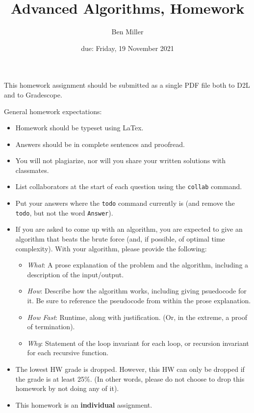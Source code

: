 \documentclass{article}
\title{Advanced Algorithms, Homework \hwnum}
\author{Ben Miller}
\date{due: Friday, 19 November 2021}
\begin{document}
\maketitle

This homework assignment should be
submitted as a single PDF file both to D2L and to Gradescope.

General homework expectations:
\begin{itemize}
    \item Homework should be typeset using LaTex.
    \item Answers should be in complete sentences and proofread.
    \item You will not plagiarize, nor will you share your written solutions
        with classmates.
    \item List collaborators at the start of each question using the
        \texttt{collab} command.
    \item Put your answers where the \texttt{todo} command currently is (and
        remove the \texttt{todo}, but not the word \texttt{Answer}).
    \item If you are asked to come up with an algorithm, you are
        expected to give an algorithm that beats the brute force (and, if possible, of
        optimal time complexity). With your algorithm, please provide the following:
        \begin{itemize}
            \item \emph{What}: A prose explanation of the problem and the algorithm,
                including a description of the input/output.
            \item \emph{How}: Describe how the algorithm works, including giving
                psuedocode for it.  Be sure to reference the pseudocode
                from within the prose explanation.
            \item \emph{How Fast}: Runtime, along with justification.  (Or, in the
                extreme, a proof of termination).
            \item \emph{Why}: Statement of the loop invariant for each loop, or
                recursion invariant for each recursive function.
        \end{itemize}
    \item The lowest HW grade is dropped.  However, this HW can only be dropped
        if the grade is at least 25\%.  (In other words, please do not choose to
        drop this homework by not doing any of it).
    \item This homework is an \textbf{individual} assignment.
\end{itemize}
\end{document}

